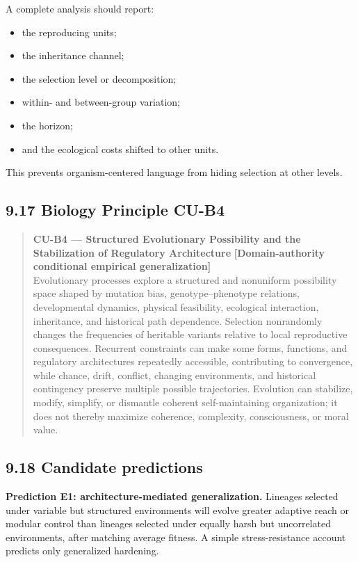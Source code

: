 \documentclass[
  11pt,
]{article}
\providecommand{\tightlist}{%
  \setlength{\itemsep}{0pt}\setlength{\parskip}{0pt}}
\begin{document}
A complete analysis should report:

\begin{itemize}
\tightlist
\item
  the reproducing units;
\item
  the inheritance channel;
\item
  the selection level or decomposition;
\item
  within- and between-group variation;
\item
  the horizon;
\item
  and the ecological costs shifted to other units.
\end{itemize}

This prevents organism-centered language from hiding selection at other
levels.

\subsection{9.17 Biology Principle CU-B4}\label{biology-principle-cu-b4}

\begin{quote}
\textbf{CU-B4 --- Structured Evolutionary Possibility and the
Stabilization of Regulatory Architecture} \textbf{{[}Domain-authority
conditional empirical generalization{]}}\\
Evolutionary processes explore a structured and nonuniform possibility
space shaped by mutation bias, genotype--phenotype relations,
developmental dynamics, physical feasibility, ecological interaction,
inheritance, and historical path dependence. Selection nonrandomly
changes the frequencies of heritable variants relative to local
reproductive consequences. Recurrent constraints can make some forms,
functions, and regulatory architectures repeatedly accessible,
contributing to convergence, while chance, drift, conflict, changing
environments, and historical contingency preserve multiple possible
trajectories. Evolution can stabilize, modify, simplify, or dismantle
coherent self-maintaining organization; it does not thereby maximize
coherence, complexity, consciousness, or moral value.
\end{quote}

\subsection{9.18 Candidate predictions}\label{candidate-predictions}

\textbf{Prediction E1: architecture-mediated generalization.} Lineages
selected under variable but structured environments will evolve greater
adaptive reach or modular control than lineages selected under equally
harsh but uncorrelated environments, after matching average fitness. A
simple stress-resistance account predicts only generalized hardening.
\end{document}
